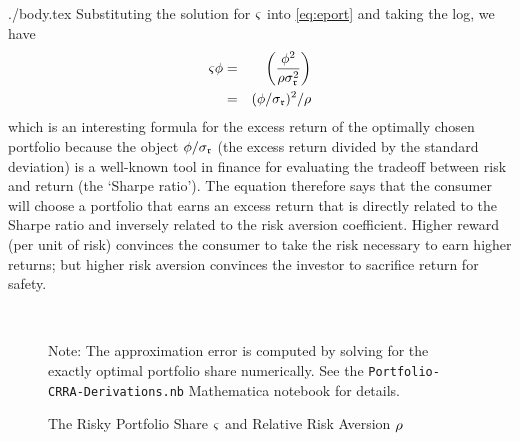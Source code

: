 \documentclass{bejournal}
\begin{document}
\begin{verbatimwrite}{./body.tex}
Substituting the solution for ${\varsigma}$ into \eqref{eq:eport} and taking the log, we have
\begin{eqnarray}
  {\varsigma} \phi & = & \left(\frac{\phi^{2}}{\rho \sigma_{\mathfrak{r}}^{2}}\right)  \notag
\\ & = &  (\phi/\sigma_{\mathfrak{r}})^{2}/\rho \label{eq:epremOpt}
\end{eqnarray}
which is an interesting formula for the excess return of the optimally
chosen portfolio because the object $\phi/\sigma_{\mathfrak{r}}$ (the
excess return divided by the standard deviation) is a well-known tool
in finance for evaluating the tradeoff between risk and return (the
`Sharpe ratio').  The equation therefore says that the consumer will
choose a portfolio that earns an excess return that is directly
related to the Sharpe ratio and inversely related to the risk aversion
coefficient.  Higher reward (per unit of risk) convinces the consumer
to take the risk necessary to earn higher returns; but higher risk
aversion convinces the investor to sacrifice return for safety.


\appendix 

\begin{figure}[h]
\caption{The Risky Portfolio Share ${\varsigma}$ and Relative Risk Aversion $\rho$} \label{fig:Port}\centering
{}\\
\vspace{.1in}  \begin{flushleft} \footnotesize Note: The approximation error is computed by solving for the exactly optimal
portfolio share numerically.  See the \texttt{Portfolio-CRRA-Derivations.nb} Mathematica notebook for details.
\end{flushleft}
\end{figure}

\end{verbatimwrite}




\end{document}
